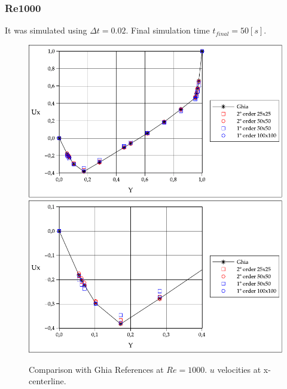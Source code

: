 \documentclass[a4paper,conference]{IEEEtran}
\begin{document}
\subsubsection{Re1000}

It was simulated using $\Delta t = 0.02$. Final simulation time $t_{final} = 50[s]$. 

\begin{figure}[htbp]
  \begin{center}
      \includegraphics[width=.85\linewidth]{images/Re_1000_Ux_v2.pdf}
      \includegraphics[width=.85\linewidth]{images/Re_1000_Ux_v2_zoom.pdf}
  \end{center}
  \caption{\label{fg:Re1000u} Comparison with Ghia References at $Re=1000$. $u$ velocities at x-centerline.}
\end{figure}
\end{document}
